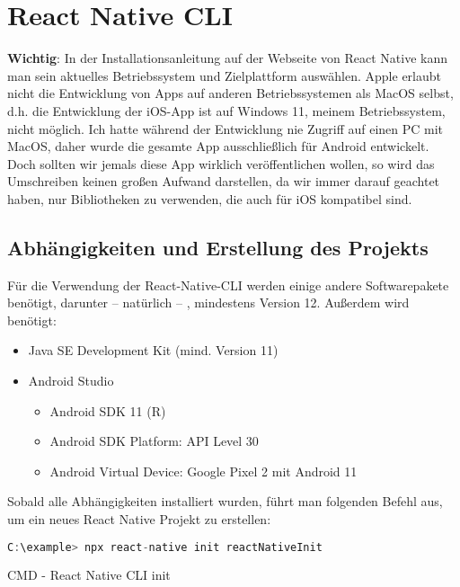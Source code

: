 \section{React Native CLI}
\textbf{Wichtig}: In der Installationsanleitung auf der Webseite von React Native kann man sein
aktuelles Betriebssystem und Zielplattform auswählen. Apple erlaubt nicht die Entwicklung von Apps
auf anderen Betriebssystemen als MacOS selbst, d.h. die Entwicklung der iOS-App ist auf Windows 11,
meinem Betriebssystem, nicht möglich. Ich hatte während der Entwicklung nie Zugriff auf einen PC mit
MacOS, daher wurde die gesamte App ausschließlich für Android entwickelt. Doch sollten wir jemals
diese App wirklich veröffentlichen wollen, so wird das Umschreiben keinen großen Aufwand darstellen,
da wir immer darauf geachtet haben, nur Bibliotheken zu verwenden, die auch für iOS kompatibel sind.

\subsection{Abhängigkeiten und Erstellung des Projekts}
Für die Verwendung der React-Native-CLI werden einige andere Softwarepakete benötigt, darunter --
natürlich -- , mindestens Version 12. Außerdem wird benötigt:

\begin{itemize}
  \item Java SE Development Kit (mind. Version 11)
  \item Android Studio
  \begin{itemize}
    \item Android SDK 11 (R)
    \item Android SDK Platform: API Level 30
    \item Android Virtual Device: Google Pixel 2 mit Android 11
  \end{itemize}
\end{itemize}

Sobald alle Abhängigkeiten installiert wurden, führt man folgenden Befehl aus, um ein neues React
Native Projekt zu erstellen:

\begin{code}[htp]
\begin{lstlisting}[firstnumber=1,language=JavaScript, style=CMD]
C:\example> npx react-native init reactNativeInit
\end{lstlisting}
\caption{CMD - React Native CLI init}
\end{code}

